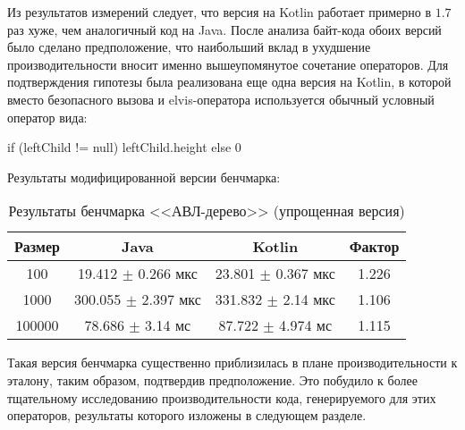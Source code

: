 Из результатов измерений следует, что версия на Kotlin работает примерно в $1.7$ раз хуже, чем
аналогичный код на Java.
После анализа байт-кода обоих версий было сделано предположение, что наибольший вклад в ухудшение
производительности вносит именно вышеупомянутое сочетание операторов.
Для подтверждения гипотезы была реализована еще одна версия на Kotlin, в которой вместо
безопасного вызова и elvis-оператора используется обычный условный оператор вида:
\begin{pyglist}[language=kotlin]
if (leftChild != null) leftChild.height else 0
\end{pyglist}

Результаты модифицированной версии бенчмарка:

\begin{table}[h]
\begin{center}
\begin{tabular}{|c|c|c|c|} \hline
Размер & Java & Kotlin & Фактор \\ \hline
100 & 19.412 $\pm$ 0.266 мкс & 23.801 $\pm$ 0.367 мкс & 1.226\\ \hline
1000 & 300.055 $\pm$ 2.397 мкс & 331.832 $\pm$ 2.14 мкс & 1.106\\ \hline
100000 & 78.686 $\pm$ 3.14 мс & 87.722 $\pm$ 4.974 мс & 1.115\\ \hline
\end{tabular}
\caption{Результаты бенчмарка <<АВЛ-дерево>> (упрощенная версия)}
\end{center}
\end{table}

Такая версия бенчмарка существенно приблизилась в плане производительности к эталону, таким образом,
подтвердив предположение.
Это побудило к более тщательному исследованию производительности кода, генерируемого
для этих операторов, результаты которого изложены в следующем разделе.

